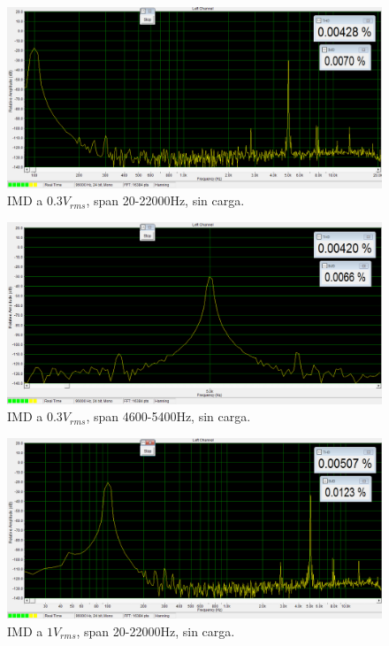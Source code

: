 \begin{figure}[H]
\centering
\includegraphics[width=\textwidth]{img/Distorsion/IMD_03V_0_22k.png}
\caption{IMD a $0.3V_{rms}$, span 20-22000Hz, sin carga.}
\label{IMD1} 
\end{figure}

\begin{figure}[H]
\centering
\includegraphics[width=\textwidth]{img/Distorsion/IMD_03V_4600_5400.png}
\caption{IMD a $0.3V_{rms}$, span 4600-5400Hz, sin carga.}
\label{IMD2} 
\end{figure}

\begin{figure}[H]
\centering
\includegraphics[width=\textwidth]{img/Distorsion/IMD_1V_20_22000.png}
\caption{IMD a $1V_{rms}$, span 20-22000Hz, sin carga.}
\label{IMD3} 
\end{figure}

